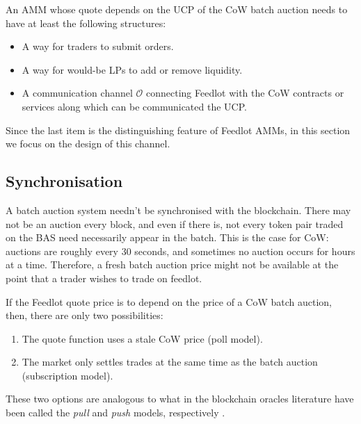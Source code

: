 \documentclass[a4paper,10pt]{article}
\theoremstyle{remark}
\begin{document}
An AMM whose quote depends on the UCP of the CoW batch auction needs to have at least the following structures:
\begin{itemize}
  \item A way for traders to submit orders.
  \item A way for would-be LPs to add or remove liquidity.
  \item A communication channel $\mathcal{O}$ connecting Feedlot with the CoW contracts or services along which can be communicated the UCP.
\end{itemize}
Since the last item is the distinguishing feature of Feedlot AMMs, in this section we focus on the design of this channel.

\subsection{Synchronisation}

A batch auction system needn't be synchronised with the blockchain.
%
There may not be an auction every block, and even if there is, not every token pair traded on the BAS need necessarily appear in the batch.
%
This is the case for CoW: auctions are roughly every 30 seconds, and sometimes no auction occurs for hours at a time.
%
Therefore, a fresh batch auction price might not be available at the point that a trader wishes to trade on feedlot.

If the Feedlot quote price is to depend on the price of a CoW batch auction, then, there are only two possibilities:
\begin{enumerate}
  \item The quote function uses a stale CoW price (poll model).
  \item The market only settles trades at the same time as the batch auction (subscription model).
\end{enumerate}
These two options are analogous to what in the blockchain oracles literature have been called the \emph{pull} and \emph{push} models, respectively \cite{heiss2019oracles,muhlberger2020foundational}.
\end{document}

